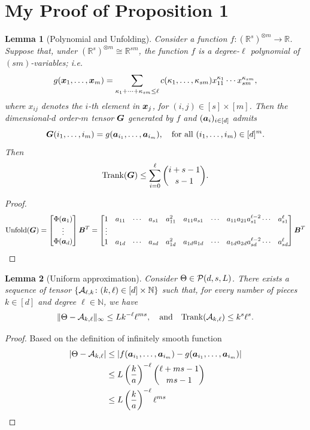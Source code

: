 \documentclass[final,12pt]{colt2020} %
\newtheorem{lem}{Lemma}
\def\rank{\textup{Trank}}
\begin{document}
\newpage
\section{My Proof of Proposition 1}
\begin{lem}[Polynomial and Unfolding]
Consider a function $f\colon (\mathbb{R}^s)^{\otimes m}  \to \mathbb{R}$. Suppose that, under $(\mathbb{R}^s)^{\otimes m} \cong \mathbb{R}^{sm}$, the function $f$ is a degree-$\ell$ polynomial of $(sm)$-variables; i.e. 
\[
g(\bm x_1,\ldots,\bm x_m)= \sum_{\kappa_1+\cdots+\kappa_{sm}\leq \ell}c(\kappa_{1},\ldots,\kappa_{sm}) x^{\kappa_{1}}_{11}\cdots x^{\kappa_{sm}}_{sm},
\]
where $x_{ij}$ denotes the $i$-th element in $\bm x_j$, for $(i,j)\in[s]\times[m]$. 
Then the dimensional-$d$ order-$m$ tensor $\bm G$ generated by $f$ and $(\bm{a}_i)_{i\in[d]}$ admits
\[
\bm G(i_1,\ldots,i_m)=g(\bm{a}_{i_1},\ldots,\bm{a}_{i_m}),\quad \text{for all}\ (i_1,\ldots,i_m)\in[d]^m.
\]
Then
\[
\rank(\mG) \leq \sum_{i=0}^\ell {i+s-1 \choose s-1}.
\]
\end{lem}
\begin{proof}
\[
\text{Unfold}(\bm G)= 
\begin{bmatrix}
\Phi(\bm{a}_1)\\
\vdots\\
\Phi(\bm{a}_d)\\
\end{bmatrix}
\bm B^T
=
\begin{bmatrix}
1& a_{11} & \cdots &a_{s1} &a^2_{11} & a_{11}a_{s1}& \cdots &a_{11}a_{21}a^{\ell-2}_{s1}\cdots & a^\ell_{s1} \\
\vdots\\
1& a_{1d} & \cdots &a_{sd} &a^2_{1d} & a_{1d}a_{1d}& \cdots &a_{1d}a_{2d}a^{\ell-2}_{sd}\cdots & a^\ell_{sd}
\end{bmatrix}
\bm B^T
\]
\end{proof}


\begin{lem}[Uniform approximation] Consider $\Theta\in\mathcal{P}(d,s,L)$. There exists a sequence of tensor $\{\mathcal{A}_{\ell,k}\colon (k,\ell)\in[d]\times\mathbb{N}\}$ such that, for every number of pieces $k\in[d]$ and degree $\ell\in\mathbb{N}$, we have
\[
\mnormSize{}{\Theta-\tA_{k,\ell}}\leq Lk^{-\ell}\ell^{ms},\quad \text{and}\quad \rank(\tA_{k,\ell})\leq k^s\ell^s.
\]
\end{lem}
\begin{proof} Based on the definition of infinitely smooth function
\begin{align}
|\Theta-\mathcal{A}_{k,\ell}|&\leq |f(\bm{a}_{i_1},\ldots,\bm{a}_{i_m})-g(\bm{a}_{i_1},\ldots,\bm{a}_{i_m})|\\
&\leq L\left(k\over a\right)^{-\ell}{\ell+ms-1\choose ms-1}\\
&\leq L\left(k\over a\right)^{-\ell} \ell^{ms}
\end{align}
\end{proof}
\end{document}
